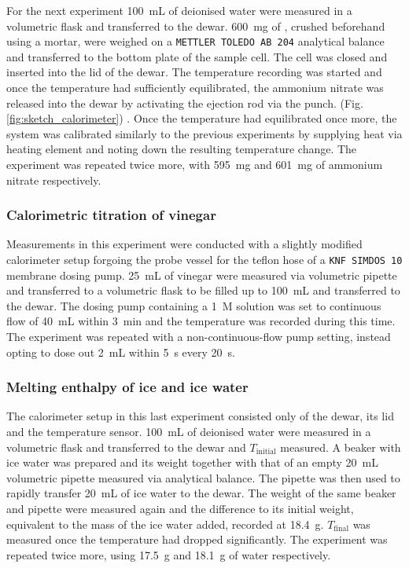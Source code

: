  For the next experiment \qty{100}{\milli\liter} of deionised water were measured in a volumetric flask and transferred to the dewar. \qty{600}{\milli\gram} of , crushed beforehand using a mortar, were weighed on a \texttt{METTLER TOLEDO AB 204} analytical balance and transferred to the bottom plate of the sample cell. The cell was closed and inserted into the lid of the dewar. The temperature recording was started and once the temperature had sufficiently equilibrated, the ammonium nitrate was released into the dewar by activating the ejection rod via the punch. (Fig. \ref{fig:sketch_calorimeter}) . Once the temperature had equilibrated once more, the system was calibrated similarly to the previous experiments by supplying heat via heating element and noting down the resulting temperature change. The experiment was repeated twice more, with \qty{595}{\milli\gram} and \qty{601}{\milli\gram} of ammonium nitrate respectively. 


\subsubsection{Calorimetric titration of vinegar} 

Measurements in this experiment were conducted with a slightly modified calorimeter setup forgoing the probe vessel for the teflon hose of a \texttt{KNF SIMDOS 10} membrane  dosing pump. 
 \qty{25}{\milli\liter} of vinegar were measured via volumetric pipette and transferred to a volumetric flask to be filled up to \qty{100}{\milli\liter} and transferred to the dewar. 
 The dosing pump containing a \qty{1}{M}  solution was set to continuous flow of \qty{40}{\milli\liter} within \qty{3}{\minute} and the temperature was recorded during this time. 
 The experiment was repeated with a non-continuous-flow pump setting, instead opting to dose out \qty{2}{\milli\liter} within \qty{5}{\second} every \qty{20}{\second}.


\subsubsection{Melting enthalpy of ice and ice water}

The calorimeter setup in this last experiment consisted only of the dewar, its lid and the temperature sensor.
\qty{100}{\milli\liter} of deionised water were measured in a volumetric flask and transferred to the dewar and $T_{\mathrm{initial}}$ measured. A beaker with ice water was prepared and its weight together with that of an empty \qty{20}{\milli\liter} volumetric pipette measured via analytical balance. The pipette was then used to rapidly transfer \qty{20}{\milli\liter} of ice water to the dewar. The weight of the same beaker and pipette were measured again and the difference to its initial weight, equivalent to the mass of the ice water added, recorded at \qty{18.4}{\gram}. $T_{\mathrm{final}}$ was measured once the temperature had dropped significantly. The experiment was repeated twice more, using \qty{17.5}{\gram} and \qty{18.1}{\gram} of water respectively.

